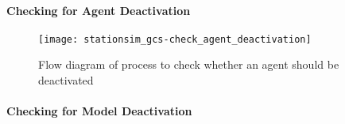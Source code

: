 \paragraph{Checking for Agent
Deactivation}\label{para:submodels:agent_deactivation}

\begin{figure}[h]
    \centering
    \texttt{[image: stationsim\_gcs-check\_agent\_deactivation]}
    \caption{Flow diagram of process to check whether an agent should be
    deactivated}\label{fig:flow:check_agent_deactivation}
\end{figure}

\paragraph{Checking for Model
Deactivation}\label{para:submodels:model_deactivation}

